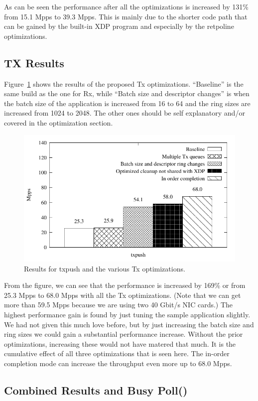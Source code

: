 \documentclass[9pt,numbers,reprint]{sigplanconf}
\begin{document}
As can be seen the performance after all the optimizations is
increased by 131\% from 15.1 Mpps to 39.3 Mpps. This is mainly due to
the shorter code path that can be gained by the built-in XDP program
and especially by the retpoline optimizations.


\subsection{TX Results}
\label{sec:exp:txres}

Figure~\ref{fig:results_tx} shows the results of the proposed Tx
optimizations. ``Baseline'' is the same build as the one for Rx,
while ``Batch size and descriptor changes'' is when the batch
size of the application is increased from 16 to 64 and the ring sizes
are increased from 1024 to 2048. The other ones should be self
explanatory and/or covered in the optimization section.

\begin{figure}[ht]
\centering
\includegraphics[width=.5\textwidth]{results_tx.pdf}
\caption{Results for txpush and the various Tx optimizations.}
\label{fig:results_tx}
\end{figure}

From the figure, we can see that the performance is increased by 169\%
or from 25.3 Mpps to 68.0 Mpps with all the Tx optimizations. (Note
that we can get more than 59.5 Mpps because we are using two 40 Gbit/s
NIC cards.) The highest performance gain is found by just tuning the sample
application slightly. We had not given this much love before, but by
just increasing the batch size and ring sizes we could gain a
substantial performance increase. Without the prior optimizations,
increasing these would not have matered that much. It is the
cumulative effect of all three optimizations that is seen here. The
in-order completion mode can increase the throughput even more up to
68.0 Mpps.


\subsection{Combined Results and Busy Poll()}
\label{sec:exp:combres}
\end{document}
